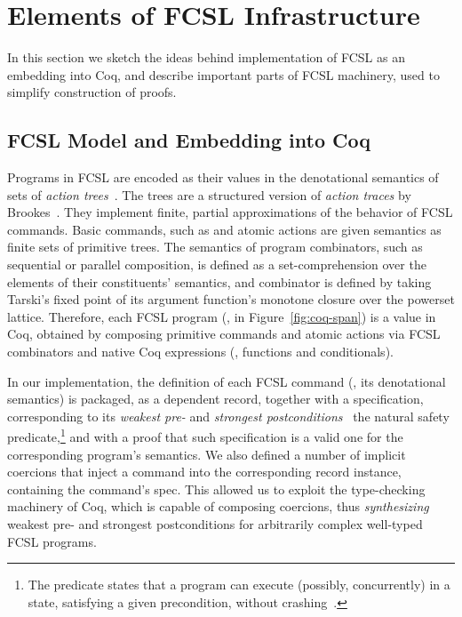 
\section{Elements of FCSL Infrastructure}
\label{sec:underhood}

In this section we sketch the ideas behind implementation of FCSL as
an embedding into Coq, and describe important parts of FCSL machinery,
used to simplify construction of proofs.

\subsection{FCSL Model and Embedding into Coq}
\label{sec:shallow-embedding}

Programs in FCSL are encoded as their values in the denotational
semantics of sets of \emph{action trees}~\cite[Appendix F of extended
version]{Nanevski-al:ESOP14}. The trees are a structured version of
\emph{action traces} by Brookes~\cite{Brookes:TCS07}. They implement
finite, partial approximations of the behavior of FCSL commands. Basic
commands, such as  and atomic actions are given semantics as
finite sets of primitive trees. The semantics of program combinators,
such as sequential or parallel composition, is defined as a
set-comprehension over the elements of their constituents' semantics,
and  combinator is defined by taking Tarski's fixed point
of its argument function's monotone closure over the powerset lattice.
%
Therefore, each FCSL program (\eg,  in
Figure~\ref{fig:coq-span}) is a value in Coq, obtained by composing
primitive commands and atomic actions via FCSL combinators and native
Coq expressions (\eg, functions and conditionals).

In our implementation, the definition of each FCSL command (\ie, its
denotational semantics) is packaged, as a dependent record, together
with a specification, corresponding to its \emph{weakest pre-} and
\emph{strongest postconditions}~\cite{Dijkstra:CACM75} \wrt the
natural safety predicate,\footnote{The predicate states that a program
  can execute (possibly, concurrently) in a state, satisfying a given
  precondition, without crashing~\cite[\S F.5]{Nanevski-al:ESOP14}.}
and with a proof that such specification is a valid one for the
corresponding program's semantics.
%
We also defined a number of implicit coercions that inject a command
into the corresponding record instance, containing the command's
spec. This allowed us to exploit the type-checking machinery of Coq,
which is capable of composing coercions, thus \emph{synthesizing}
weakest pre- and strongest postconditions for arbitrarily complex
well-typed FCSL programs.

